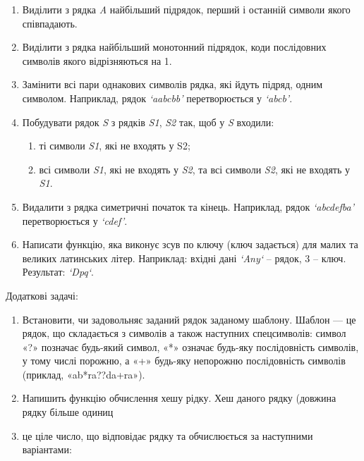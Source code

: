 \documentclass[]{article}
\makeatletter
\newcommand{\xslalph}[1]{\expandafter\@xslalph\csname c@#1\endcsname}
\newcommand{\@xslalph}[1]{%
    \ifcase#1\or а\or б\or в\or г\or д\or e\or є\or ж\or з\or i%
    \or й\or к\or л\or м\or н\or о\or п\or р\or с\or т%
    \or у\or ф\or х\or ц\or ч\or ш\or ю\or я\or аа\or бб\or вв%
    \else\@ctrerr\fi%
}
\makeatother
\begin{document}
\begin{enumerate}
\begin{enumerate}[label=\xslalph*)]
\begin{enumerate}
\begin{enumerate}[label=\xslalph*)]
\begin{enumerate}
\item 
  Виділити з рядка \emph{A} найбільший підрядок, перший і останній
  символи якого співпадають.
\item
  Виділити з рядка найбільший монотонний підрядок, коди послідовних
  символів якого відрізняються на 1.
\item
  Замінити всі пари однакових символів рядка, які йдуть підряд, одним
  символом. Наприклад, рядок \emph{`aabcbb'} перетворюється у
  \emph{`abcb'}.
\item
  Побудувати рядок \emph{S} з рядків \emph{S1}, \emph{S2} так, щоб у
  \emph{S} входили:
\begin{enumerate}[label=\xslalph*)]
\item ті символи \emph{S1}, які не входять у S2;
\item всі символи \emph{S1}, які не входять у \emph{S2}, та всі символи
\emph{S2}, які не входять у \emph{S1}.
\end{enumerate}

\item
Видалити з рядка симетричні початок та кінець. Наприклад, рядок
\emph{`abcdefba'} перетворюється у \emph{`cdef'}. 

\item
Написати функцію, яка виконує зсув по ключу (ключ задається) для малих 
та великих латинських літер. Наприклад: вхідні дані \emph{`Any`} -- рядок, 3 -- ключ.
Результат: \emph{`Dpq`}.

\end{enumerate}

Додаткові задачі:

\begin{enumerate}
\def\labelenumi{\arabic{enumi})}
\setcounter{enumi}{29}
\item
  Встановити, чи задовольняє заданий рядок заданому шаблону. Шаблон ---
  це рядок, що складається з символів а також наступних спецсимволів:
  символ «?» позначає будь-який символ, «*» означає будь-яку
  послідовність символів, у тому числі порожню, а «+» будь-яку непорожню
  послідовність символів (приклад, «ab*ra??da+ra»).

\item
 Напишить функцію обчислення хешу рідку. Хеш даного рядку
 (довжина рядку більше одиниц\item це ціле число, 
що відповідає рядку та обчислюється за наступними варіантами:
\end{enumerate}


\end{enumerate}
\end{enumerate}
\end{enumerate}
\end{enumerate}
\end{document}
